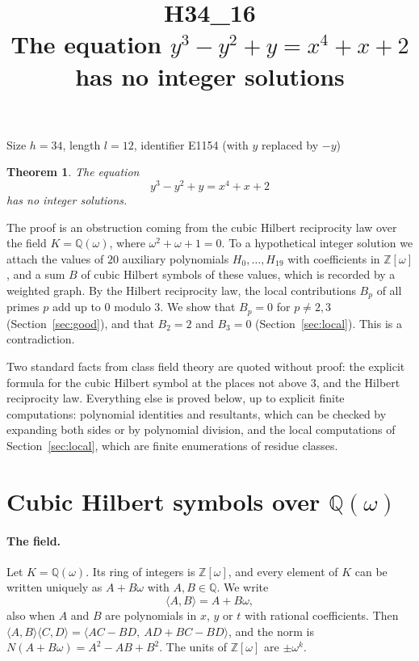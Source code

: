 \documentclass[11pt]{article}
\title{\textbf{H34\_16}\\[4pt] The equation $y^3-y^2+y=x^4+x+2$ has no integer solutions}
\author{}
\date{}
\newtheorem{theorem}{Theorem}
\newcommand{\Z}{\mathbb{Z}}
\newcommand{\Q}{\mathbb{Q}}
\begin{document}
\maketitle
\vspace{-8ex}
\begin{center}
Size $h=34$, length $l=12$, identifier E1154 (with $y$ replaced by $-y$)
\end{center}

\begin{theorem}\label{thm:main}
The equation
\begin{equation}\label{eq:main}
y^3-y^2+y=x^4+x+2
\end{equation}
has no integer solutions.
\end{theorem}

The proof is an obstruction coming from the cubic Hilbert reciprocity law over the field $K=\Q(\omega)$, where $\omega^2+\omega+1=0$. To a hypothetical integer solution we attach the values of $20$ auxiliary polynomials $H_0,\dots,H_{19}$ with coefficients in $\Z[\omega]$, and a sum $B$ of cubic Hilbert symbols of these values, which is recorded by a weighted graph. By the Hilbert reciprocity law, the local contributions $B_p$ of all primes $p$ add up to $0$ modulo $3$. We show that $B_p=0$ for $p\neq2,3$ (Section~\ref{sec:good}), and that $B_2=2$ and $B_3=0$ (Section~\ref{sec:local}). This is a contradiction.

Two standard facts from class field theory are quoted without proof: the explicit formula for the cubic Hilbert symbol at the places not above $3$, and the Hilbert reciprocity law. Everything else is proved below, up to explicit finite computations: polynomial identities and resultants, which can be checked by expanding both sides or by polynomial division, and the local computations of Section~\ref{sec:local}, which are finite enumerations of residue classes.

\section{\texorpdfstring{Cubic Hilbert symbols over $\Q(\omega)$}{Cubic Hilbert symbols over Q(w)}}\label{sec:symbols}

\paragraph{The field.} Let $K=\Q(\omega)$. Its ring of integers is $\Z[\omega]$, and every element of $K$ can be written uniquely as $A+B\omega$ with $A,B\in\Q$. We write
\[
\langle A,B\rangle=A+B\omega,
\]
also when $A$ and $B$ are polynomials in $x$, $y$ or $t$ with rational coefficients. Then $\langle A,B\rangle\langle C,D\rangle=\langle AC-BD,\ AD+BC-BD\rangle$, and the norm is $N(A+B\omega)=A^2-AB+B^2$. The units of $\Z[\omega]$ are $\pm\omega^k$.
\end{document}

